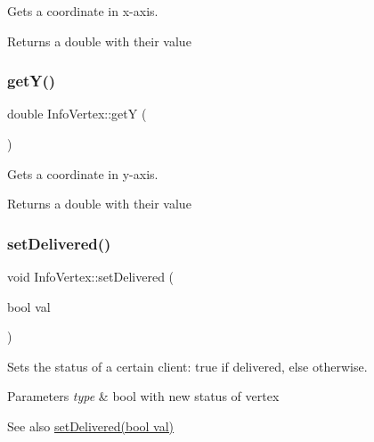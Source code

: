 Gets a coordinate in x-\/axis. 

\begin{DoxyReturn}{Returns}
a double with their value 
\end{DoxyReturn}
\hypertarget{class_info_vertex_a89c623b235ae7e76454ceface0e6ef6b}{}\label{class_info_vertex_a89c623b235ae7e76454ceface0e6ef6b} 
\subsubsection{\texorpdfstring{get\+Y()}{getY()}}
{\footnotesize\ttfamily double Info\+Vertex\+::getY (\begin{DoxyParamCaption}{ }\end{DoxyParamCaption})}



Gets a coordinate in y-\/axis. 

\begin{DoxyReturn}{Returns}
a double with their value 
\end{DoxyReturn}
\hypertarget{class_info_vertex_aa4e371bf7f81fb5767f36fafafa03e4a}{}\label{class_info_vertex_aa4e371bf7f81fb5767f36fafafa03e4a} 
\subsubsection{\texorpdfstring{set\+Delivered()}{setDelivered()}}
{\footnotesize\ttfamily void Info\+Vertex\+::set\+Delivered (\begin{DoxyParamCaption}\item[{bool}]{val }\end{DoxyParamCaption})}



Sets the status of a certain client\+: true if delivered, else otherwise. 


\begin{DoxyParams}{Parameters}
{\em type} & bool with new status of vertex \\
\hline
\end{DoxyParams}
\begin{DoxySeeAlso}{See also}
\hyperlink{class_info_vertex_aa4e371bf7f81fb5767f36fafafa03e4a}{set\+Delivered(bool val)} 
\end{DoxySeeAlso}
\hypertarget{class_info_vertex_a76710ab50065ffbb8d41bb998fe55a79}{}\label{class_info_vertex_a76710ab50065ffbb8d41bb998fe55a79} 

